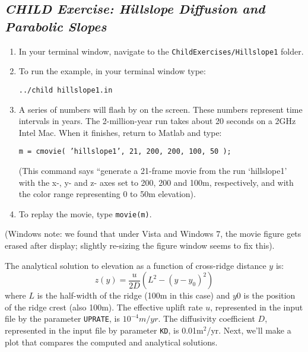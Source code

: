 \documentclass[12pt]{amsart}
\begin{document}
\subsection*{\em CHILD Exercise: Hillslope Diffusion and Parabolic Slopes}
{\em
\begin{enumerate}
\item
In your terminal window, navigate to the {\tt ChildExercises/Hillslope1} folder. 
\item
To run the example, in your terminal window type:

\noindent
{\tt ../child hillslope1.in}

\item
A series of numbers will flash by on the screen. These numbers represent time intervals in years. The 2-million-year run takes about 20 seconds on a 2GHz Intel Mac. When it finishes, return to Matlab and type: 

{\tt m = cmovie( 'hillslope1', 21, 200, 200, 100, 50 );}

\noindent (This command says ``generate a 21-frame movie from the run `hillslope1' with the x-, y- and z- axes set to 200, 200 and 100m, respectively, and with the color range representing 0 to 50m elevation).
\item
To replay the movie, type {\tt movie(m)}.

\end{enumerate}
(Windows note: we found that under Vista and Windows 7, the movie figure gets erased after display; slightly re-sizing the figure window seems to fix this).
}
\medskip

The analytical solution to elevation as a function of cross-ridge distance $y$ is:
\begin{equation}
z(y) = \frac{u}{2D} \left( L^2 - (y-y_0)^2 \right)
\end{equation}
where $L$ is the half-width of the ridge (100m in this case) and $y0$ is the position of the ridge crest (also 100m). The effective uplift rate $u$, represented in the input file by the parameter {\tt UPRATE}, is $10^{-4}m/yr$. The diffusivity coefficient $D$, represented in the input file by parameter {\tt KD}, is 0.01m$^2$/yr. Next, we'll make a plot that compares the computed and analytical solutions. 
\end{document}
